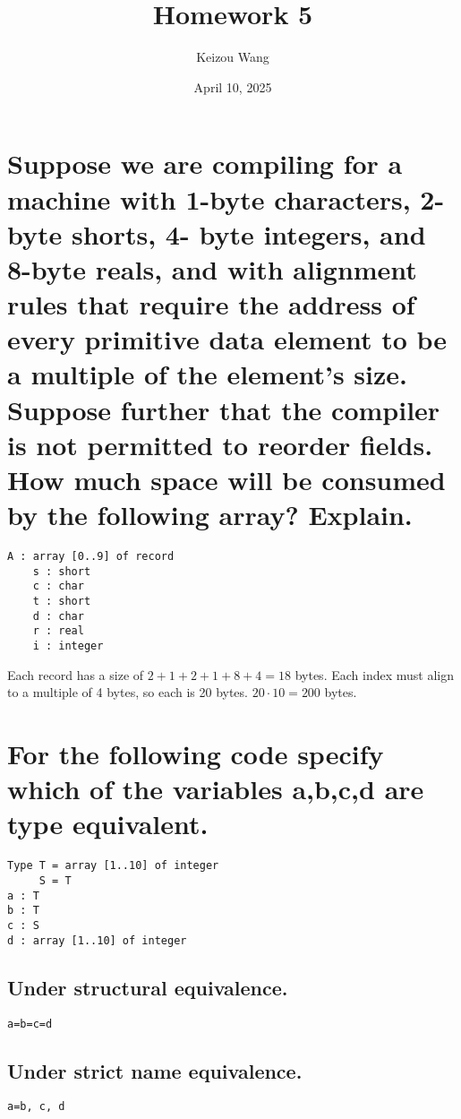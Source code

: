 \documentclass[letterpaper]{article}
\title{Homework 5}
\author{Keizou Wang}
\date{April 10, 2025}
\begin{document}
\maketitle

\section{Suppose we are compiling for a machine with 1-byte characters, 2-byte shorts, 4- byte integers, and 8-byte reals, and with alignment rules that require the address of every primitive data element to be a multiple of the element's size. Suppose further that the compiler is not permitted to reorder fields. How much space will be consumed by the following array? Explain.}
\begin{adjustwidth}{2.35em}{0pt}
\begin{Verbatim}[tabsize=4]
A : array [0..9] of record
	s : short
	c : char
	t : short
	d : char
	r : real
	i : integer
\end{Verbatim}
Each record has a size of $2+1+2+1+8+4=18$ bytes. Each index must align to a multiple of 4 bytes, so each is 20 bytes. $20\cdot10=200$ bytes.
\end{adjustwidth}

\section{For the following code specify which of the variables a,b,c,d are type equivalent.}
\begin{adjustwidth}{2.35em}{0pt}
\begin{Verbatim}[tabsize=4]
Type T = array [1..10] of integer
     S = T
a : T
b : T
c : S
d : array [1..10] of integer
\end{Verbatim}
\end{adjustwidth}
\subsection{Under structural equivalence.}
\begin{adjustwidth}{2.35em}{0pt}
\begin{Verbatim}[tabsize=4]
a=b=c=d 
\end{Verbatim}
\end{adjustwidth}
\subsection{Under strict name equivalence.}
\begin{adjustwidth}{2.35em}{0pt}
\begin{Verbatim}[tabsize=4]
a=b, c, d
\end{Verbatim}
\end{adjustwidth}
\end{document}
